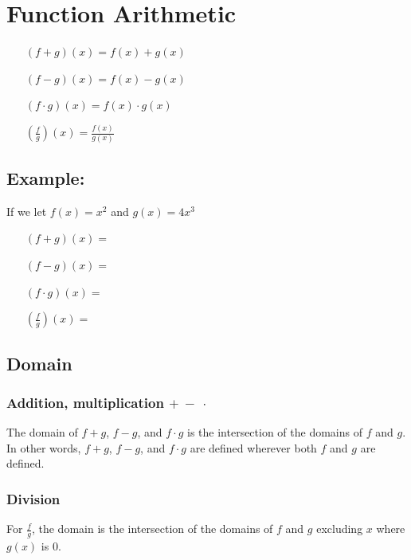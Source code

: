 \documentclass[20pt]{extarticle}
\newcommand{\LP}{\left(}
\newcommand{\RP}{\right)}
\begin{document}
\newpage

\section*{\textbf{\color{draculaorange}Function Arithmetic}}
\begin{itemize}
  \item[]{\(\LP f+g\RP (x)=f(x)+g(x)\)}
  \item[]{\(\LP f-g\RP (x)=f(x)-g(x)\)}
  \item[]{\(\LP f\cdot g\RP (x)=f(x)\cdot g(x)\)}
  \item[]{\(\LP \frac{f}{g}\RP (x)=\frac{f(x)}{g(x)}\)}
\end{itemize}
\subsection*{\textbf{\color{draculared}\textbf{Example:}}}
If we let \(f(x)=x^2\) and \(g(x)=4x^3\)
\begin{itemize}[align=left]
  \item[\(\LP f+g\RP (x)=\)]{\underline{\hspace{5cm}}}
  \item[\(\LP f-g\RP (x)=\)]{\underline{\hspace{5cm}}}
  \item[\(\LP f\cdot g\RP (x)=\)]{\underline{\hspace{5cm}}}
  \item[\(\LP \frac{f}{g}\RP (x)=\)]{\underline{\hspace{5cm}}}
\end{itemize}
\newpage
\subsection*{\textbf{\color{draculaorange}Domain}}
\subsubsection*{\textbf{\color{draculaorange}Addition, multiplication \(+\ -\ \cdot\)}}
The domain of $f+g$, $f-g$, and $f\cdot g$ is the intersection of the domains of $f$ and $g$. In other words, $f+g$, $f-g$, and $f\cdot g$ are defined wherever both $f$ and $g$ are defined.
\vskip6cm
\subsubsection*{\textbf{\color{draculaorange}Division}}
For $\frac{f}{g}$, the domain is the intersection of the domains of $f$ and $g$ excluding $x$ where $g(x)$ is 0.\\
\vskip6cm
\end{document}
